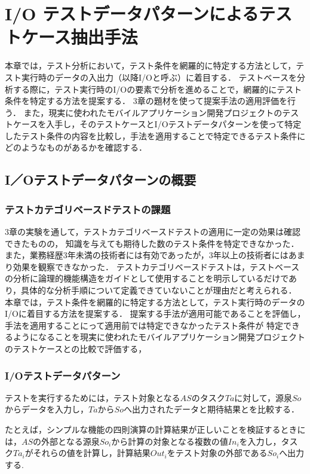 
\chapter{I/O テストデータパターンによるテストケース抽出手法}\label{chap:4}
本章では，テスト分析において，テスト条件を網羅的に特定する方法として，テスト実行時のデータの入出力（以降I/Oと呼ぶ）に着目する．
テストベースを分析する際に，テスト実行時のI/Oの要素で分析を進めることで，網羅的にテスト条件を特定する方法を提案する．
3章の題材を使って提案手法の適用評価を行う．
また，現実に使われたモバイルアプリケーション開発プロジェクトのテストケースを入手し，そのテストケースとI/Oテストデータパターンを使って特定したテスト条件の内容を比較し，手法を適用することで特定できるテスト条件にどのようなものがあるかを確認する．

\newpage
\section{I／Oテストデータパターンの概要} \label{sec:4-1}
\subsection{テストカテゴリベースドテストの課題} \label{sec:4-1-1}
3章の実験を通して，テストカテゴリベースドテストの適用に一定の効果は確認できたものの，
知識を与えても期待した数のテスト条件を特定できなかった．
また，業務経歴3年未満の技術者には有効であったが，3年以上の技術者にはあまり効果を観察できなかった．
テストカテゴリベースドテストは，テストベースの分析に論理的機能構造をガイドとして使用することを明示しているだけであり，具体的な分析手順について定義できていないことが理由だと考えられる．
本章では，テスト条件を網羅的に特定する方法として，テスト実行時のデータのI/Oに着目する方法を提案する．
提案する手法が適用可能であることを評価し，手法を適用することにって適用前では特定できなかったテスト条件が
特定できるようになることを現実に使われたモバイルアプリケーション開発プロジェクトのテストケースとの比較で評価する，

\subsection{I/Oテストデータパターン} \label{sec:4-1-1}
テストを実行するためには，テスト対象となる$AS$のタスク$Ta$に対して，源泉$So$からデータを入力し，$Ta$から$So$へ出力されたデータと期待結果とを比較する．

たとえば，シンプルな機能の四則演算の計算結果が正しいことを検証するときには，$AS$の外部となる源泉$So_i$から計算の対象となる複数の値$In_i$を入力し，タスク$Ta_i$がそれらの値を計算し，計算結果$Out_i$をテスト対象の外部である$So_i$へ出力する.

